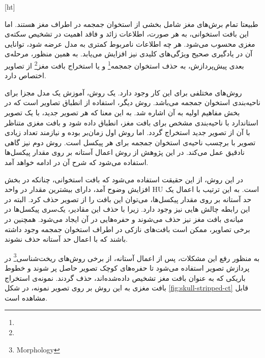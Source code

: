 [ht]


طبیعتا تمام برش‌های مغز شامل بخشی از استخوان جمجمه در اطراف مغز هستند.
اما این بافت استخوانی، به هر صورت، اطلاعات زائد و فاقد اهمیت در تشخیص سکته‌ی مغزی محسوب می‌شود.
هر چه اطلاعات نامربوط کمتری به مدل عرضه شود، توانایی آن در یادگیری صحیح ویژگی‌های کلیدی نیز افزایش می‌یابد.
به همین منظور، مرحله‌ی بعدی پیش‌پردازش، به 
حذف استخوان جمجمه\footnote{}
و یا 
استخراج بافت مغز\footnote{}
از تصاویر اختصاص دارد.

روش‌های مختلفی برای این کار وجود دارد.
یک روش، آموزش یک مدل مجزا برای ناحیه‌بندی استخوان جمجمه می‌باشد.
روش دیگر، استفاده از انطباق تصاویر است که در بخش مفاهیم اولیه به آن اشاره شد.
به این معنا که هر تصویر جدید، با یک تصویر استاندارد با ناحیه‌بندی مشخص برای بافت مغز، انطباق داده شود و بافت مغزی متناظر با آن از تصویر جدید استخراج گردد.
اما روش اول زمان‌بر بوده و نیازمند تعداد زیادی تصویر با برچسب ناحیه‌ی استخوان جمجمه برای هر پیکسل است.
روش دوم نیز گاهی نادقیق عمل می‌کند.
در این پژوهش از روش اعمال آستانه بر روی مقدار پیکسل‌ها استفاده می‌شود که شرح آن در ادامه خواهد آمد.

در این روش، از این حقیقت استفاده می‌شود که بافت استخوانی، چنانکه در بخش افزایش وضوح آمد، دارای بیشترین مقدار در واحد HU است.
به این ترتیب با اعمال یک حد آستانه بر روی مقدار پیکسل‌ها، می‌‌توان این بافت را از تصویر حذف کرد.
البته در این رابطه چالش هایی نیز وجود دارد.
زیرا با حذف این مقادیر، یک‌سری پیکسل‌ها در میانه‌ی بافت مغز نیز حذف می‌شوند و حفره‌هایی در آن ایجاد می‌شود.
همچنین در برخی تصاویر، ممکن است بافت‌های نازکی در اطراف استخوان جمجمه وجود داشته باشند که با اعمال حد آستانه حذف نشوند.

به منظور رفع این مشکلات، پس از اعمال آستانه، از برخی روش‌های 
ریخت‌شناسی\footnote{Morphology}
در پردازش تصویر استفاده می‌شود تا
حفره‌های کوچک تصویر حاصل پر شوند و 
خطوط باریکی که به عنوان بافت مغز تشخیص داده‌شده‌اند، حذف گردند.
نمونه‌ی استخراج بافت مغزی به این روش بر روی تصویر نمونه، در شکل \ref{fig:skull-stripped-ct}
قابل مشاهده است.


